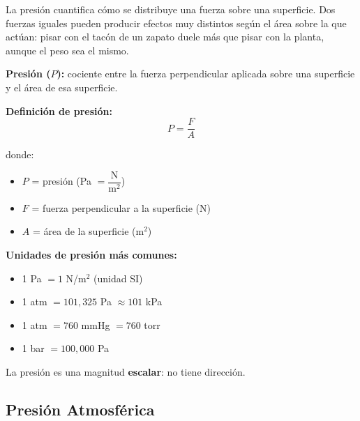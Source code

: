 \begin{seccion}
La presión cuantifica cómo se distribuye una fuerza sobre una superficie. Dos fuerzas iguales pueden producir efectos muy distintos según el área sobre la que actúan: pisar con el tacón de un zapato duele más que pisar con la planta, aunque el peso sea el mismo.

\begin{definicion}
\textbf{Presión ($P$):} cociente entre la fuerza perpendicular aplicada sobre una superficie y el área de esa superficie.
\end{definicion}

\begin{ecuacion}
\textbf{Definición de presión:}
$$P = \frac{F}{A}$$

donde:
\begin{itemize}
    \item $P$ = presión (Pa $= \dfrac{\text{N}}{\text{m}^2}$)
    \item $F$ = fuerza perpendicular a la superficie (N)
    \item $A$ = área de la superficie (m$^2$)
\end{itemize}
\end{ecuacion}

\begin{nota}
\textbf{Unidades de presión más comunes:}
\begin{itemize}
    \item 1 Pa $= 1$ N/m$^2$ (unidad SI)
    \item 1 atm $= 101{,}325$ Pa $\approx 101$ kPa
    \item 1 atm $= 760$ mmHg $= 760$ torr
    \item 1 bar $= 100{,}000$ Pa
\end{itemize}
La presión es una magnitud \textbf{escalar}: no tiene dirección.
\end{nota}
\end{seccion}

\subsection{Presión Atmosférica}

